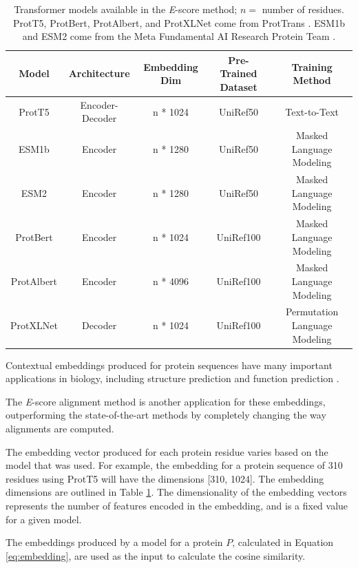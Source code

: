 \documentclass[
	letterpaper, %
	10pt, %
]{journalArticle}
\begin{document}
\begin{table} %
	\caption{Transformer models available in the \textit{E}-score method; \(n=\) number of residues. ProtT5, ProtBert, ProtAlbert, and ProtXLNet come from ProtTrans \autocite{Elnaggar:2021}. ESM1b and ESM2 come from the Meta Fundamental AI Research Protein Team \autocite{Rives:2021}.}
	\centering
	\begin{tabular}{ |c|c|c|c|c| }
		\toprule
		Model & Architecture & Embedding Dim & Pre-Trained Dataset & Training Method \\
		\midrule
		ProtT5 & Encoder-Decoder & n * 1024 & UniRef50 & Text-to-Text \\
        ESM1b & Encoder & n * 1280 & UniRef50 & Masked Language Modeling \\
        ESM2 & Encoder & n * 1280 & UniRef50 & Masked Language Modeling \\
		ProtBert & Encoder & n * 1024 & UniRef100 & Masked Language Modeling \\
		ProtAlbert & Encoder & n * 4096 & UniRef100 & Masked Language Modeling \\
        ProtXLNet & Decoder & n * 1024 & UniRef100 & Permutation Language Modeling \\
		\bottomrule
	\end{tabular}
	\label{tab:transformers}
\end{table}

Contextual embeddings produced for protein sequences have many important applications in biology, including structure prediction \autocite{Senior:2020, Yang:2019, Jumper:2021} and function prediction \autocite{Kulmanov:2019, Gligorijevic:2021, Lai:2021}. 

The \textit{E}-score alignment method is another application for these embeddings, outperforming the state-of-the-art methods \autocite{Ashrafzadeh:2023} by completely changing the way alignments are computed.

The embedding vector produced for each protein residue varies based on the model that was used. For example, the embedding for a protein sequence of 310 residues using ProtT5 will have the dimensions [310, 1024]. The embedding dimensions are outlined in Table \ref{tab:transformers}. The dimensionality of the embedding vectors represents the number of features encoded in the embedding, and is a fixed value for a given model.

The embeddings produced by a model for a protein \(P\), calculated in Equation \ref{eq:embedding}, are used as the input to calculate the cosine similarity.
\end{document}
